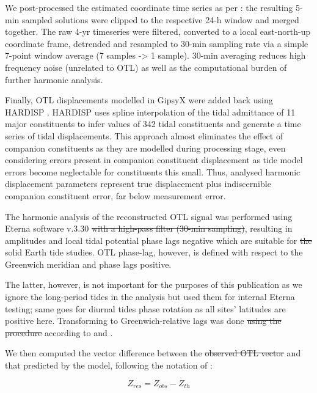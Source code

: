 \documentclass[se, manuscript]{copernicus}
\providecommand{\DIFadd}[1]{{\protect\color{blue}\uwave{#1}}} %
\providecommand{\DIFdel}[1]{{\protect\color{red}\sout{#1}}}                      %
\providecommand{\DIFaddbegin}{} %
\providecommand{\DIFaddend}{} %
\providecommand{\DIFdelbegin}{} %
\providecommand{\DIFdelend}{} %
\begin{document}
We post-processed the estimated coordinate time series as per \cite{Penna2015}: the resulting 5-min sampled solutions were clipped to the respective 24-h window and merged together. The raw 4-yr timeseries were filtered, converted to a local east-north-up coordinate frame, detrended and resampled to 30-min sampling rate via a simple 7-point window average (7 samples -> 1 sample). 30-min averaging reduces high frequency noise (unrelated to OTL) as well as the computational burden of further harmonic analysis.

Finally, OTL displacements modelled in GipsyX were added back using HARDISP \citep{IERS2010}. HARDISP uses spline interpolation of the tidal admittance of 11 major constituents to infer values of 342 tidal constituents and generate a time series of tidal displacements. This approach almost eliminates the effect of companion constituents \citep{Foreman1989} as they are modelled during \DIFaddbegin \DIFadd{the }\DIFaddend processing stage, even considering errors present in companion constituent displacement as tide model errors become neglectable for constituents this small. Thus, analysed harmonic displacement parameters represent true displacement plus indiscernible companion constituent error, far below measurement error.

The harmonic analysis of the reconstructed OTL signal was performed using \DIFaddbegin \DIFadd{the }\DIFaddend Eterna software v.3.30 \citep{Wenzel1996}\DIFdelbegin \DIFdel{with a high-pass filter (30-min sampling)}\DIFdelend , resulting in amplitudes and local tidal potential phase lags negative which are suitable for \DIFdelbegin \DIFdel{the }\DIFdelend solid Earth tide studies. OTL phase-lag, however, is defined with respect to the Greenwich meridian and phase lags positive.

The latter, however, is not important for the purposes of this publication as we ignore the long-period tides in the analysis but used them for internal Eterna testing; same goes for diurnal tides phase rotation as all sites’ latitudes are positive here. Transforming to Greenwich-relative lags was done \DIFdelbegin \DIFdel{using the procedure }\DIFdelend according to \cite{Boy2003} and \cite{Bos2000}.

We then computed the vector difference between the \DIFdelbegin \DIFdel{observed OTL vector }\DIFdelend \DIFaddbegin \DIFadd{reconstructed observed OTL }\DIFaddend and that predicted by the model, following the notation of \cite{Yuan2013}:

\begin{equation}
Z_{res} = Z_{obs}- Z_{th}
\end{equation}
\end{document}
